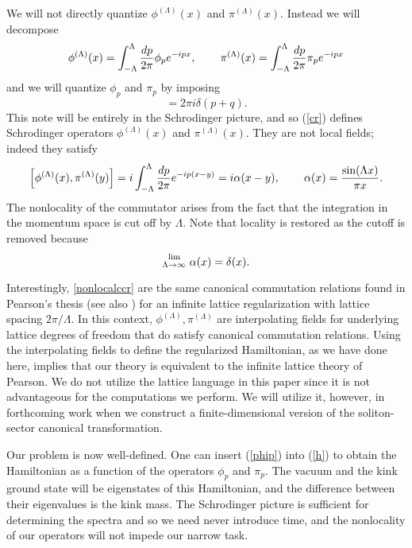 \def\letter{0}\def\pr{0}\documentclass[a4paper,12pt, epsfig]{article}
\def\hsp{,\hspace{.7cm}}
\renewcommand{\sin}{\textrm{sin}}
\renewcommand{\(}{\begin{equation}}
\renewcommand{\)}{end{equation} \vspace{-.05in}\linebreak}
\renewcommand{\=}{\hspace{-.03in}=\hspace{-.02in}}
\renewcommand{\(}{\begin{equation}}
\renewcommand{\)}{\end{equation}}
\renewcommand{\hsp}{,\hspace{.3in}}
\renewcommand{\(}{\begin{equation}}
\renewcommand{\)}{\end{equation}}
\def\lpin#1{\int^\Lambda_{-\Lambda} \frac{d#1}{2\pi}}
\renewcommand{\L}{{(\Lambda)}}
\newcommand{\beq}{\begin{equation}}
\newcommand{\eeq}{\end{equation}}
\begin{document}
We will not directly quantize $\phi^\L(x)$ and $\pi^\L(x)$.  Instead we will decompose
\beq
\phi^\L(x)=\lpin{p} \phi_p e^{-ipx}\hsp
\pi^\L(x)=\lpin{p} \pi_p e^{-ipx} \label{phip}
\eeq
and we will quantize $\phi_p$ and $\pi_p$ by imposing
\beq
[\phi_p,\pi_q]=2\pi i \delta(p+q). \label{cr}
\eeq
This note will be entirely in the Schrodinger picture, and so (\ref{cr}) defines Schrodinger operators $\phi^\L(x)$ and $\pi^\L(x)$.  They are not local fields; indeed they satisfy
\beq \label{nonlocalccr}
\left[\phi^\L(x),\pi^\L(y)\right]=i\lpin{p}e^{-ip(x-y)}=i\alpha(x-y)\hsp
\alpha(x)=\frac{\sin (\Lambda x)}{\pi x}.
\eeq
The nonlocality of the commutator arises from the fact that the integration in the momentum space is cut off by $\Lambda$.  Note that locality is restored as the cutoff is removed because
\beq
\stackrel{\rm{lim}}{{}_{\Lambda\rightarrow\infty}}\alpha(x)=\delta(x). \label{alim}
\eeq

Interestingly, \eqref{nonlocalccr} are the same canonical commutation relations found in Pearson's thesis \cite{pearson} (see also \cite{dwy}) for an infinite lattice regularization with lattice spacing $2\pi/\Lambda$.  In this context, $\phi^{(\Lambda)}, \pi^{(\Lambda)}$ are interpolating fields for underlying lattice degrees of freedom that do satisfy canonical commutation relations.  Using the interpolating fields to define the regularized Hamiltonian, as we have done here, implies that our theory is equivalent to the infinite lattice theory of Pearson.  We do not utilize the lattice language in this paper since it is not advantageous for the computations we perform.  We will utilize it, however, in forthcoming work when we construct a finite-dimensional version of the soliton-sector canonical transformation.

Our problem is now well-defined.  One can insert (\ref{phip}) into (\ref{h}) to obtain the Hamiltonian as a function of the operators $\phi_p$ and $\pi_p$.  The vacuum and the kink ground state will be eigenstates of this Hamiltonian, and the difference between their eigenvalues is the kink mass.  The Schrodinger picture is sufficient for determining the spectra and so we need never introduce time, and the nonlocality of our operators will not impede our narrow task.
\end{document}
